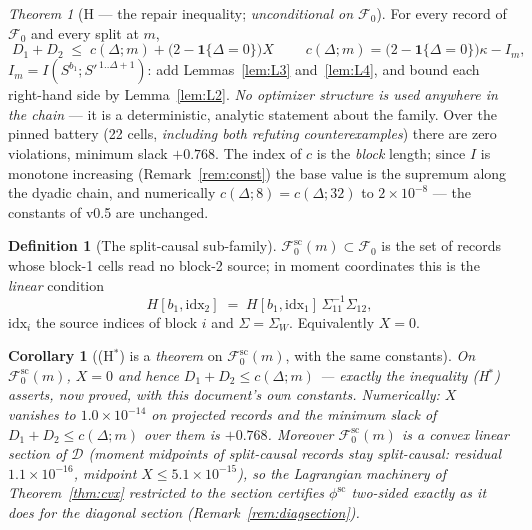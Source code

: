 \documentclass[11pt]{article}
\newtheorem{corollary}{Corollary}
\theoremstyle{definition}
\newtheorem{definition}{Definition}
\theoremstyle{remark}
\newtheorem{namedthm}{Theorem}
\begin{document}
\begin{namedthm}[H --- the repair inequality;
\emph{unconditional on $\mathcal F_0$}]
\label{thm:hrep}
For every record of $\mathcal F_0$ and every split at $m$,
\[
\boxed{\;D_1+D_2\;\le\;c(\Delta;m)+\bigl(2-\mathbf 1\{\Delta=0\}\bigr)X\;}
\qquad
c(\Delta;m)=\bigl(2-\mathbf 1\{\Delta=0\}\bigr)\kappa-I_m ,
\]
$I_m=I(S^{b_1};S'^{\,1..\Delta+1})$: add Lemmas~\ref{lem:L3}
and~\ref{lem:L4}, and bound each right-hand side by
Lemma~\ref{lem:L2}. \emph{No optimizer structure is used anywhere in
the chain} --- it is a deterministic, analytic statement about the
family. Over the pinned battery (22 cells, \emph{including both
refuting counterexamples}) there are zero violations, minimum slack
$+0.768$. The index of $c$ is the \emph{block} length; since
$I$ is monotone increasing (Remark~\ref{rem:const}) the base value is
the supremum along the dyadic chain, and numerically
$c(\Delta;8)=c(\Delta;32)$ to $2\times10^{-8}$ --- the constants of
v0.5 are unchanged.
\end{namedthm}

\begin{definition}[The split-causal sub-family]
\label{def:sc}
$\mathcal F_0^{\mathrm{sc}}(m)\subset\mathcal F_0$ is the set of
records whose block-1 cells read no block-2 source; in moment
coordinates this is the \emph{linear} condition
\[
H[b_1,\mathrm{idx}_2]\;=\;H[b_1,\mathrm{idx}_1]\,
\Sigma_{11}^{-1}\Sigma_{12},
\]
$\mathrm{idx}_i$ the source indices of block $i$ and
$\Sigma=\Sigma_W$. Equivalently $X=0$.
\end{definition}

\begin{corollary}[(H$^\ast$) is a \emph{theorem} on
$\mathcal F_0^{\mathrm{sc}}(m)$, with the same constants]
\label{cor:scthm}
On $\mathcal F_0^{\mathrm{sc}}(m)$, $X=0$ and hence
$D_1+D_2\le c(\Delta;m)$ --- exactly the inequality (H$^\ast$)
asserts, now proved, with this document's own constants. Numerically:
$X$ vanishes to $1.0\times10^{-14}$ on projected records and the
minimum slack of $D_1+D_2\le c(\Delta;m)$ over them is $+0.768$.
Moreover $\mathcal F_0^{\mathrm{sc}}(m)$ is a \emph{convex linear
section} of $\mathcal D$ (moment midpoints of split-causal records stay
split-causal: residual $1.1\times10^{-16}$, midpoint $X\le
5.1\times10^{-15}$), so the Lagrangian machinery of
Theorem~\ref{thm:cvx} restricted to the section certifies
$\phi^{\mathrm{sc}}$ two-sided exactly as it does for the diagonal
section (Remark~\ref{rem:diagsection}).
\end{corollary}
\end{document}
